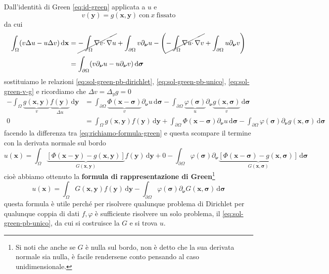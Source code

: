 \documentclass[10pt,a4paper,twoside,openright]{book}
\newcommand{\x}{\mathbf{x}}
\newcommand{\y}{\mathbf{y}}
\newcommand{\sigg}{\bm{\sigma}}
\newcommand{\nuu}{\bm{\nu}}
\newcommand{\de}{\,\mathrm d}
\newcommand{\dxx}{\de \x}
\newcommand{\dyy}{\de \y}
\newcommand{\dsig}{\de \sigg}
\begin{document}
Dall'identità di Green \eqref{eq:id-green} applicata a $u$ e
\begin{equation}
	v(\y) =g(\x,\y) \ \text{con} \ x\ \text{fissato}
	\label{eq:sol-green-v-g}
\end{equation}
da cui
\begin{align*}
	\int _{\Omega }(v\Delta u-u\Delta v) \dxx & =\cancel{-\int _{\Omega } \nabla v\cdotp \nabla u} +\int _{\partial \Omega } v\partial _{\nuu} u-\left(\cancel{-\int _{\Omega } \nabla u\cdotp \nabla v} +\int _{\partial \Omega } u\partial _{\nuu} v\right) \\
	 & =\int _{\partial \Omega }(v\partial _{\nuu} u-u\partial _{\nuu} v) \dsig                                                                                                                                 
\end{align*}
sostituiamo le relazioni \eqref{eq:sol-green-pb-dirichlet}, \eqref{eq:sol-green-pb-unico}, \eqref{eq:sol-green-v-g} e ricordiamo che $\Delta v=\Delta _{y} g=0$
\begin{align*}
	-\int _{\Omega } \underbrace{g(\x,\y)}_{v} \underbrace{f(\y)}_{\Delta u} \dyy & =\int _{\partial \Omega } \underbrace{\Phi (\x-\sigg)}_{v} \partial _{\nuu} u\dsig -\int _{\partial \Omega } \underbrace{\varphi (\sigg)}_{u} \partial _{\nuu} \underbrace{g(\x,\sigg)}_{v} \dsig                                  \\
	0                                 & =\int _{\Omega } g(\x,\y) f(\y) \dyy+\int _{\partial \Omega } \Phi (\x-\sigg) \partial _{\nuu} u\dsig -\int _{\partial \Omega } \varphi (\sigg) \partial _{\nuu} g(\x,\sigg) \dsig 
\end{align*}
facendo la differenza tra \eqref{eq:richiamo-formula-green} e questa scompare il termine con la derivata normale sul bordo
\begin{equation*}
	u(\x) =\int _{\Omega }\underbrace{[ \Phi (\x-\y) -g(\x,\y)]}_{G(\x,\y)} f(\y) \dyy+0-\int _{\partial \Omega } \varphi (\sigg) \partial_{\nuu}\underbrace{[ \Phi (\x-\sigg) -g(\x,\sigg)]}_{G(\x,\sigg)} \dsig 
\end{equation*}
cioè abbiamo ottenuto la \textbf{formula di rappresentazione di Green}\footnote{Si noti che anche se $G$ è nulla sul bordo, non è detto che la sua derivata normale sia nulla, è facile rendersene conto pensando al caso unidimensionale.}
\begin{equation*}
	\boxed{u(\x) =\int _{\Omega } G(\x,\y) f(\y) \dyy-\int _{\partial \Omega } \varphi (\sigg) \partial_{\nuu} G(\x,\sigg) \dsig }
\end{equation*}
questa formula è utile perché per risolvere qualunque problema di Dirichlet per qualunque coppia di dati $f,\varphi $ è sufficiente risolvere un solo problema, il \eqref{eq:sol-green-pb-unico}, da cui si costruisce la $G$ e si trova $u$.
\end{document}
